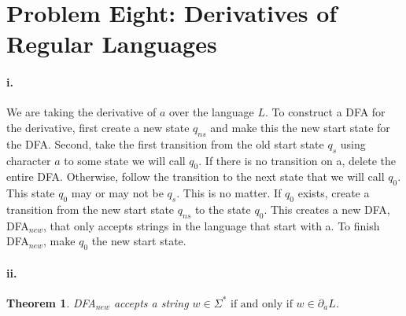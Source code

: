 \documentclass[10pt,letter]{article}
\newtheorem*{thm}{Theorem}
\begin{document}
\section*{Problem Eight: Derivatives of Regular Languages}

\paragraph{i.} We are taking the derivative of $a$ over the language $L$. To construct a DFA for the derivative, first create a new state $q_{ns}$ and make this the new start state for the DFA. Second, take the first transition from the old start state $q_s$ using character $a$ to some state we will call $q_0$. If there is no transition on a, delete the entire DFA. Otherwise, follow the transition to the next state that we will call $q_0$. This state $q_0$ may or may not be $q_s$. This is no matter. If $q_0$ exists, create a transition from the new start state $q_{ns}$ to the state $q_0$. This creates a new DFA, DFA$_{new}$, that only accepts strings in the language that start with a. To finish DFA$_{new}$, make $q_0$ the new start state. 

\paragraph{ii.} 
\begin{thm} DFA$_{new}$ accepts a string $w \in \Sigma^* \text{ if and only if } w \in \partial_a L$. 
\end{thm}
\end{document}
